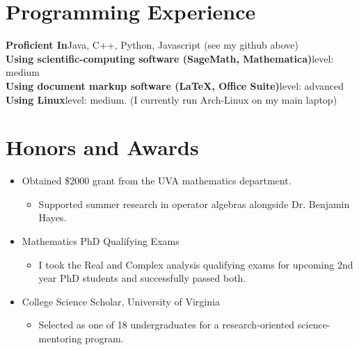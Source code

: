 \documentclass[12pt,letterpaper,sans]{moderncv}
\begin{document}
\section{Programming Experience}
\textbf{Proficient In}\quad Java, C++, Python, Javascript (see my github above) \\
\textbf{Using scientific-computing software (SageMath, Mathematica)}\quad level: medium \\
\textbf{Using document markup software (\LaTeX, Office Suite)}\quad level: advanced \\
\textbf{Using Linux}\quad level: medium. (I currently run Arch-Linux on my main laptop)

\section{Honors and Awards}
\begin{itemize}
  \item Obtained \$2000 grant from the UVA mathematics department.
  \begin{itemize}
    \item Supported summer research in operator algebras alongside Dr. Benjamin Hayes.
  \end{itemize}
  \item Mathematics PhD Qualifying Exams
  \begin{itemize}
    \item I took the Real and Complex analysis qualifying exams for upcoming 2nd year PhD students and successfully passed both.
  \end{itemize}
  \item College Science Scholar, University of Virginia
  \begin{itemize}
    \item Selected as one of 18 undergraduates for a research-oriented science-mentoring program.
  \end{itemize}


  
\end{itemize}
\end{document}
